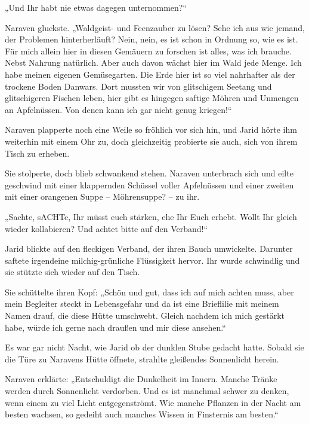 „Und Ihr habt nie etwas dagegen unternommen?“

Naraven gluckste. „Waldgeist- und Feenzauber zu lösen? Sehe ich aus wie jemand, der Problemen hinterherläuft? Nein, nein, es ist schon in Ordnung so, wie es ist. Für mich allein hier in diesen Gemäuern zu forschen ist alles, was ich brauche. Nebst Nahrung natürlich. Aber auch davon wächst hier im Wald jede Menge. Ich habe meinen eigenen Gemüsegarten. Die Erde hier ist so viel nahrhafter als der trockene Boden Danwars. Dort mussten wir von glitschigem Seetang und glitschigeren Fischen leben, hier gibt es hingegen saftige Möhren und Unmengen an Apfelnüssen. Von denen kann ich gar nicht genug kriegen!“

Naraven plapperte noch eine Weile so fröhlich vor sich hin, und Jarid hörte ihm weiterhin mit einem Ohr zu, doch gleichzeitig probierte sie auch, sich von ihrem Tisch zu erheben.

Sie stolperte, doch blieb schwankend stehen. Naraven unterbrach sich und eilte geschwind mit einer klappernden Schüssel voller Apfelnüssen und einer zweiten mit einer orangenen Suppe – Möhrensuppe? – zu ihr.

„Sachte, sACHTe, Ihr müsst euch stärken, ehe Ihr Euch erhebt. Wollt Ihr gleich wieder kollabieren? Und achtet bitte auf den Verband!“

Jarid blickte auf den fleckigen Verband, der ihren Bauch umwickelte. Darunter saftete irgendeine milchig-grünliche Flüssigkeit hervor. Ihr wurde schwindlig und sie stützte sich wieder auf den Tisch.

Sie schüttelte ihren Kopf: „Schön und gut, dass ich auf mich achten muss, aber mein Begleiter steckt in Lebensgefahr und da ist eine Brieflilie mit meinem Namen drauf, die diese Hütte umschwebt. Gleich nachdem ich mich gestärkt habe, würde ich gerne nach draußen und mir diese ansehen.“\bigskip







Es war gar nicht Nacht, wie Jarid ob der dunklen Stube gedacht hatte. Sobald sie die Türe zu Naravens Hütte öffnete, strahlte gleißendes Sonnenlicht herein.

Naraven erklärte: „Entschuldigt die Dunkelheit im Innern. Manche Tränke werden durch Sonnenlicht verdorben. Und es ist manchmal schwer zu denken, wenn einem zu viel Licht entgegenströmt. Wie manche Pflanzen in der Nacht am besten wachsen, so gedeiht auch manches Wissen in Finsternis am besten.“

